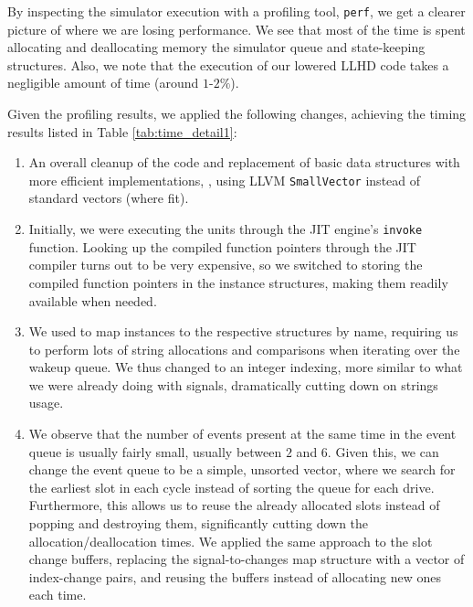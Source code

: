 By inspecting the simulator execution with a profiling tool, \texttt{perf}, we get a clearer picture of where we are losing performance. We see that most of the time is spent allocating and deallocating memory the simulator queue and state-keeping structures. Also, we note that the execution of our lowered LLHD code takes a negligible amount of time (around $1$-$2\%$).

Given the profiling results, we applied the following changes, achieving the timing results listed in Table \ref{tab:time_detail1}:

\begin{enumerate}
  \item An overall cleanup of the code and replacement of basic data structures with more efficient implementations, \eg, using LLVM \texttt{SmallVector} instead of standard vectors (where fit).
  \item Initially, we were executing the units through the JIT engine's \texttt{invoke} function. Looking up the compiled function pointers through the JIT compiler turns out to be very expensive, so we switched to storing the compiled function pointers in the instance structures, making them readily available when needed.
  \item We used to map instances to the respective structures by name, requiring us to perform lots of string allocations and comparisons when iterating over the wakeup queue. We thus changed to an integer indexing, more similar to what we were already doing with signals, dramatically cutting down on strings usage.
  \item We observe that the number of events present at the same time in the event queue is usually fairly small, usually between $2$ and $6$. Given this, we can change the event queue to be a simple, unsorted vector, where we search for the earliest slot in each cycle instead of sorting the queue for each drive. Furthermore, this allows us to reuse the already allocated slots instead of popping and destroying them, significantly cutting down the allocation/deallocation times. We applied the same approach to the slot change buffers, replacing the signal-to-changes map structure with a vector of index-change pairs, and reusing the buffers instead of allocating new ones each time.
\end{enumerate}

